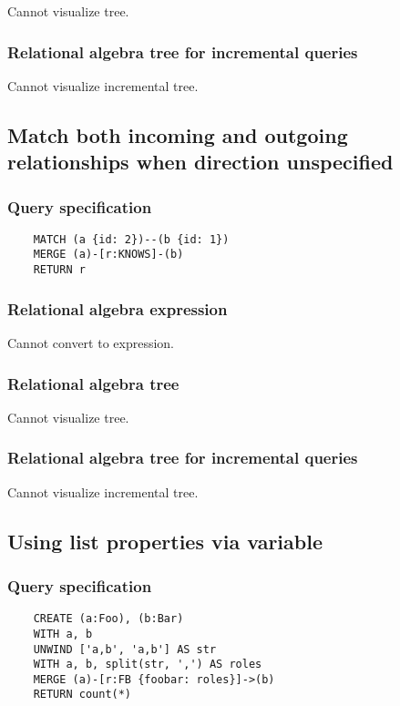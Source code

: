 	Cannot visualize tree.

	\subsubsection*{Relational algebra tree for incremental queries}

	Cannot visualize incremental tree.
	\subsection{Match both incoming and outgoing relationships when direction unspecified}

	\subsubsection*{Query specification}

	\begin{lstlisting}
	MATCH (a {id: 2})--(b {id: 1})
	MERGE (a)-[r:KNOWS]-(b)
	RETURN r
	\end{lstlisting}


	\subsubsection*{Relational algebra expression}

	Cannot convert to expression.

	\subsubsection*{Relational algebra tree}

	Cannot visualize tree.

	\subsubsection*{Relational algebra tree for incremental queries}

	Cannot visualize incremental tree.
	\subsection{Using list properties via variable}

	\subsubsection*{Query specification}

	\begin{lstlisting}
	CREATE (a:Foo), (b:Bar)
	WITH a, b
	UNWIND ['a,b', 'a,b'] AS str
	WITH a, b, split(str, ',') AS roles
	MERGE (a)-[r:FB {foobar: roles}]->(b)
	RETURN count(*)
	\end{lstlisting}


